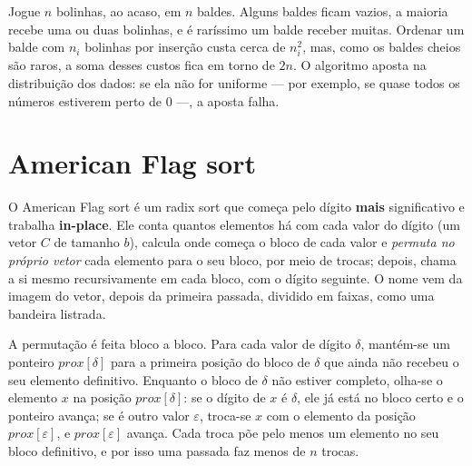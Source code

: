 \begin{intuicao}
Jogue $n$ bolinhas, ao acaso, em $n$ baldes. Alguns baldes ficam vazios, a maioria recebe uma ou duas bolinhas, e é raríssimo um balde receber muitas. Ordenar um balde com $n_i$ bolinhas por inserção custa cerca de $n_i^2$, mas, como os baldes cheios são raros, a soma desses custos fica em torno de $2n$. O algoritmo aposta na distribuição dos dados: se ela não for uniforme --- por exemplo, se quase todos os números estiverem perto de 0 ---, a aposta falha.
\end{intuicao}

\section{American Flag sort}\label{sec:flag}
O American Flag sort é um radix sort que começa pelo dígito \textbf{mais} significativo e trabalha \textbf{in-place}. Ele conta quantos elementos há com cada valor do dígito (um vetor $C$ de tamanho $b$), calcula onde começa o bloco de cada valor e \emph{permuta no próprio vetor} cada elemento para o seu bloco, por meio de trocas; depois, chama a si mesmo recursivamente em cada bloco, com o dígito seguinte. O nome vem da imagem do vetor, depois da primeira passada, dividido em faixas, como uma bandeira listrada.

A permutação é feita bloco a bloco. Para cada valor de dígito $\delta$, mantém-se um ponteiro $prox[\delta]$ para a primeira posição do bloco de $\delta$ que ainda não recebeu o seu elemento definitivo. Enquanto o bloco de $\delta$ não estiver completo, olha-se o elemento $x$ na posição $prox[\delta]$: se o dígito de $x$ é $\delta$, ele já está no bloco certo e o ponteiro avança; se é outro valor $\varepsilon$, troca-se $x$ com o elemento da posição $prox[\varepsilon]$, e $prox[\varepsilon]$ avança. Cada troca põe pelo menos um elemento no seu bloco definitivo, e por isso uma passada faz menos de $n$ trocas.

